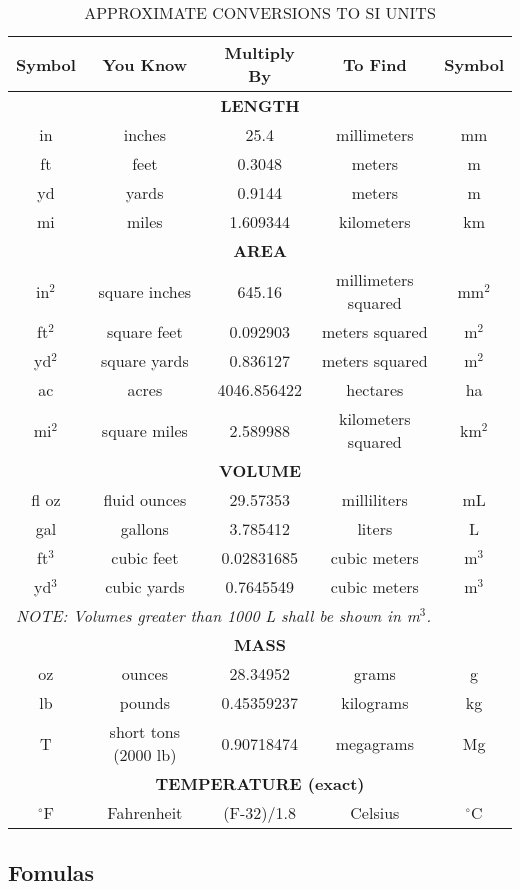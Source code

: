 \documentclass{article}
\begin{document}
  \begin{table}[h!]
  \centering
  \caption{APPROXIMATE CONVERSIONS TO SI UNITS}
  \begin{tabular}{|c|c|c|c|c|}
  \hline
  \textbf{Symbol} & \textbf{You Know} & \textbf{Multiply By} & \textbf{To Find} & \textbf{Symbol} \\
  \hline
  \multicolumn{5}{|c|}{\textbf{LENGTH}} \\
  \hline
  in & inches & 25.4 & millimeters & mm \\
  ft & feet & 0.3048 & meters & m \\
  yd & yards & 0.9144 & meters & m \\
  mi & miles & 1.609344 & kilometers & km \\
  \hline
  \multicolumn{5}{|c|}{\textbf{AREA}} \\
  \hline
  in\(^2\) & square inches & 645.16 & millimeters squared & mm\(^2\) \\
  ft\(^2\) & square feet & 0.092903 & meters squared & m\(^2\) \\
  yd\(^2\) & square yards & 0.836127 & meters squared & m\(^2\) \\
  ac & acres & 4046.856422 & hectares & ha \\
  mi\(^2\) & square miles & 2.589988 & kilometers squared & km\(^2\) \\
  \hline
  \multicolumn{5}{|c|}{\textbf{VOLUME}} \\
  \hline
  fl oz & fluid ounces & 29.57353 & milliliters & mL \\
  gal & gallons & 3.785412 & liters & L \\
  ft\(^3\) & cubic feet & 0.02831685 & cubic meters & m\(^3\) \\
  yd\(^3\) & cubic yards & 0.7645549 & cubic meters & m\(^3\) \\
  \multicolumn{5}{|l|}{\textit{NOTE: Volumes greater than 1000 L shall be shown in m\(^3\).}} \\
  \hline
  \multicolumn{5}{|c|}{\textbf{MASS}} \\
  \hline
  oz & ounces & 28.34952 & grams & g \\
  lb & pounds & 0.45359237 & kilograms & kg \\
  T & short tons (2000 lb) & 0.90718474 & megagrams & Mg \\
  \hline
  \multicolumn{5}{|c|}{\textbf{TEMPERATURE (exact)}} \\
  \hline
  \(^{\circ}\)F & Fahrenheit & (F-32)/1.8 & Celsius & \(^{\circ}\)C \\
  \hline
  \end{tabular}
  \label{tab:conversion_table}
  \end{table}
  
  \subsection{Fomulas}




\end{document}
